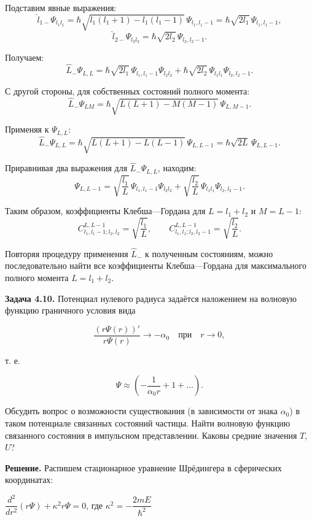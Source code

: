 \documentclass[a4paper, 12pt]{article}
\begin{document}
	\quad Подставим явные выражения:
	\[
	\hat{l}_{1-} \Psi_{l_1 l_1} = \hbar\sqrt{l_1(l_1+1) - l_1(l_1-1)} \, \Psi_{l_1, l_1-1} = \hbar\sqrt{2l_1} \, \Psi_{l_1, l_1-1},
	\]
	\[
	\hat{l}_{2-} \Psi_{l_2 l_2} = \hbar\sqrt{2l_2} \, \Psi_{l_2, l_2-1}.
	\]
	
	\quad Получаем:
	\[
	\hat{L}_- \Psi_{L, L} = \hbar\sqrt{2l_1} \, \Psi_{l_1, l_1-1} \Psi_{l_2 l_2} + \hbar\sqrt{2l_2} \, \Psi_{l_1 l_1} \Psi_{l_2, l_2-1}.
	\]
	
	\quad С другой стороны, для собственных состояний полного момента:
	\[
	\hat{L}_- \Psi_{L M} = \hbar\sqrt{L(L+1) - M(M-1)} \, \Psi_{L, M-1}.
	\]
	
	\quad Применяя к \( \Psi_{L, L} \):
	\[
	\hat{L}_- \Psi_{L, L} = \hbar\sqrt{L(L+1) - L(L-1)} \, \Psi_{L, L-1} = \hbar\sqrt{2L} \, \Psi_{L, L-1}.
	\]
	
	\quad Приравнивая два выражения для \( \hat{L}_- \Psi_{L, L} \), находим:
	\[
	\Psi_{L, L-1} = \sqrt{\frac{l_1}{L}} \, \Psi_{l_1, l_1-1} \Psi_{l_2 l_2} + \sqrt{\frac{l_2}{L}} \, \Psi_{l_1 l_1} \Psi_{l_2, l_2-1}.
	\]
	
	\quad Таким образом, коэффициенты Клебша—Гордана для \( L = l_1 + l_2 \) и \( M = L-1 \):
	\[
	C_{l_1, l_1-1; l_2, l_2}^{L, L-1} = \sqrt{\frac{l_1}{L}},
	\qquad
	C_{l_1, l_1; l_2, l_2-1}^{L, L-1} = \sqrt{\frac{l_2}{L}}.
	\]
	
	\quad Повторяя процедуру применения \( \hat{L}_- \) к полученным состояниям, можно последовательно найти все коэффициенты Клебша—Гордана для максимального полного момента \( L = l_1 + l_2 \).
	
	\quad \textbf{Задача 4.10.} Потенциал нулевого радиуса задаётся наложением на волновую функцию граничного условия вида
	
	\[
	\frac{(r \Psi(r))'}{r \Psi(r)} \rightarrow -\alpha_0 \quad \text{при} \quad r \to 0,
	\]
	
	т. е.
	
	\[
	\Psi \approx \left( - \frac{1}{\alpha_0 r} + 1 + \ldots \right).
	\]
	
	Обсудить вопрос о возможности существования (в зависимости от знака $\alpha_0$) в таком потенциале связанных состояний частицы. Найти волновую функцию связанного состояния в импульсном представлении. Каковы средние значения $T$, $U$?
	
	\quad \textbf{Решение. } Распишем стационарное уравнение Шрёдингера в сферических координатах: 
	
	\begin{center}
		$\dfrac{d^2}{dr^2} \left(r\Psi\right) + \kappa^2 r\Psi = 0$, где $\kappa^2 = -\dfrac{2mE}{\hbar^2}$ 
	\end{center}
	
\end{document}

